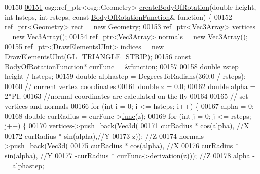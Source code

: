 \begin{DoxyCode}
00150 
\hypertarget{_util_functions_8cpp_source_l00151}{}\hyperlink{namespacebrtr_a83d3e627c9dc247459610aa9fec23d7b}{00151}     osg::ref\_ptr<osg::Geometry> \hyperlink{namespacebrtr_a83d3e627c9dc247459610aa9fec23d7b}{createBodyOfRotation}(\textcolor{keywordtype}{double} height, \textcolor{keywordtype}{int} hsteps, \textcolor{keywordtype}{int} 
      rsteps, \textcolor{keyword}{const} \hyperlink{structbrtr_1_1_body_of_rotation_function}{BodyOfRotationFunction}& \textcolor{keyword}{function}) \{
00152         ref\_ptr<Geometry> rect = \textcolor{keyword}{new} Geometry;
00153         ref\_ptr<Vec3Array> vertices = \textcolor{keyword}{new} Vec3Array();
00154         ref\_ptr<Vec3Array> normals = \textcolor{keyword}{new} Vec3Array();
00155         ref\_ptr<DrawElementsUInt> indices = \textcolor{keyword}{new} DrawElementsUInt(GL\_TRIANGLE\_STRIP);
00156         \textcolor{keyword}{const} \hyperlink{structbrtr_1_1_body_of_rotation_function}{BodyOfRotationFunction}* curFunc = &\textcolor{keyword}{function};
00157 
00158         \textcolor{keywordtype}{double} zstep = height / hsteps;
00159         \textcolor{keywordtype}{double} alphastep = DegreesToRadians(360.0 / rsteps);
00160         \textcolor{comment}{// current vertex coordinates}
00161         \textcolor{keywordtype}{double} z = 0.0;
00162         \textcolor{keywordtype}{double} alpha = 2*PI;
00163         \textcolor{comment}{//normal coordinates are calculated on the fly}
00164 
00165         \textcolor{comment}{// set vertices and normals}
00166         \textcolor{keywordflow}{for} (\textcolor{keywordtype}{int} i = 0; i <= hsteps; i++) \{
00167             alpha = 0;
00168             \textcolor{keywordtype}{double} curRadius = curFunc->\hyperlink{structbrtr_1_1_body_of_rotation_function_a5fda598eb0a63696b059e3a27c01142b}{func}(z);
00169             \textcolor{keywordflow}{for} (\textcolor{keywordtype}{int} j = 0; j <= rsteps; j++) \{
00170                 vertices->push\_back(Vec3d(
00171                     curRadius * cos(alpha), \textcolor{comment}{//X }
00172                     curRadius * sin(alpha),\textcolor{comment}{//Y }
00173                     z));                   \textcolor{comment}{//Z}
00174                 normals->push\_back(Vec3d(
00175                     curRadius * cos(alpha), \textcolor{comment}{//X}
00176                     curRadius * sin(alpha), \textcolor{comment}{//Y}
00177                     -curRadius * curFunc->\hyperlink{structbrtr_1_1_body_of_rotation_function_a22861c378686dabe1c35c90a0a8dcf46}{derivation}(z))); \textcolor{comment}{//Z}
00178                 alpha -= alphastep;

\end{DoxyCode}
